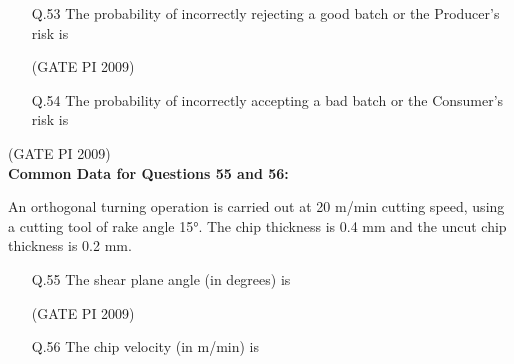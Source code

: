 \documentclass[journal,12pt,onecolumn]{IEEEtran}
\theoremstyle{remark}
\begin{document}
\begin{enumerate}[label=Q.\arabic*), leftmargin=*]
\setcounter{enumi}{52}

\item[Q.53] The probability of incorrectly rejecting a good batch or the Producer's risk is
\begin{enumerate}
\end{enumerate}
\hfill (GATE PI 2009)
\item[Q.54] The probability of incorrectly accepting a bad batch or the Consumer's risk is
\begin{enumerate}
\end{enumerate}
\end{enumerate}
\hfill (GATE PI 2009) \\
\textbf{Common Data for Questions 55 and 56:}

An orthogonal turning operation is carried out at 20 m/min cutting speed, using a cutting tool of rake angle 15°. The chip thickness is 0.4 mm and the uncut chip thickness is 0.2 mm.

\begin{enumerate}[label=Q.\arabic*, leftmargin=*]
\setcounter{enumi}{54}

\item[Q.55] The shear plane angle (in degrees) is
\begin{enumerate}
\end{enumerate}
\hfill (GATE PI 2009)
\item[Q.56] The chip velocity (in m/min) is
\begin{enumerate}
\end{enumerate}
\end{enumerate}
\end{document}
